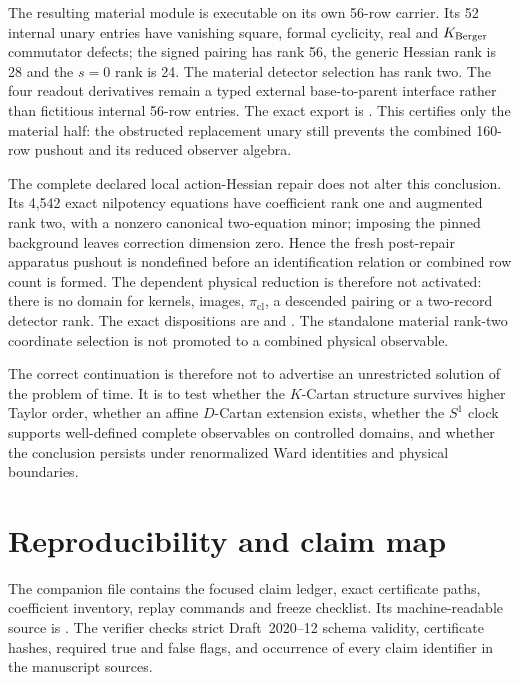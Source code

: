\documentclass[11pt]{article}
\theoremstyle{definition}
\theoremstyle{remark}
\begin{document}
The resulting material module is executable on its own 56-row carrier.  Its
52 internal unary entries have vanishing square, formal cyclicity, real and
\(K_{\rm Berger}\) commutator defects; the signed pairing has rank 56, the
generic Hessian rank is 28 and the \(s=0\) rank is 24.  The material detector
selection has rank two.  The four readout derivatives remain a typed external
base-to-parent interface rather than fictitious internal 56-row entries.  The
exact export is
.
This certifies only the material half: the obstructed replacement unary still
prevents the combined 160-row pushout and its reduced observer algebra.

The complete declared local action-Hessian repair does not alter this
conclusion.  Its 4,542 exact nilpotency equations have coefficient rank one
and augmented rank two, with a nonzero canonical two-equation minor; imposing
the pinned background leaves correction dimension zero.  Hence the fresh
post-repair apparatus pushout is nondefined before an identification relation
or combined row count is formed.  The dependent physical reduction is
therefore not activated: there is no domain for kernels, images,
\(\pi_{\mathrm{cl}}\), a descended pairing or a two-record detector rank.
The exact dispositions are
and
.
The standalone material rank-two coordinate selection is not promoted to a
combined physical observable.

The correct continuation is therefore not to advertise an unrestricted
solution of the problem of time.  It is to test whether the $K$-Cartan
structure survives higher Taylor order, whether an affine $D$-Cartan
extension exists, whether the $S^1$ clock supports
well-defined complete observables on controlled domains, and whether the
conclusion persists under renormalized Ward identities and physical
boundaries.

\section{Reproducibility and claim map}\label{sec:repro}

The companion file
contains the focused claim ledger, exact certificate paths, coefficient
inventory, replay commands and freeze checklist.  Its machine-readable source
is
.
The verifier checks strict Draft~2020--12 schema validity, certificate hashes,
required true and false flags, and occurrence of every claim identifier in
the manuscript sources.
\end{document}
